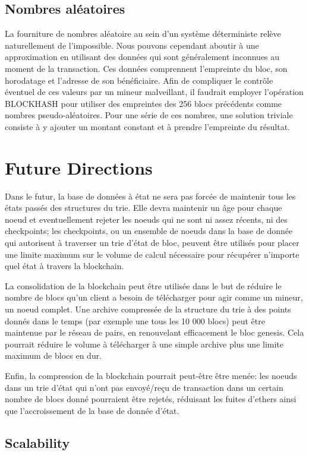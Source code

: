 \documentclass[9pt,oneside]{amsart}
\begin{document}
\begin{multicols}{2}
\subsection{Nombres aléatoires}
La fourniture de nombres aléatoire au sein d'un système déterministe relève naturellement de l'impossible. Nous pouvons cependant aboutir à une approximation en utilisant des données qui sont généralement inconnues au moment de la transaction. Ces données comprennent l'empreinte du bloc, son horodatage et l'adresse de son bénéficiaire. Afin de compliquer le contrôle éventuel de ces valeurs par un mineur malveillant, il faudrait employer l'opération {\small BLOCKHASH} pour utiliser des empreintes des 256 blocs précédents comme nombres pseudo-aléatoires. Pour une série de ces nombres, une solution triviale consiste à y ajouter un montant constant et à prendre l'empreinte du résultat.

\section{Future Directions} \label{ch:future}

Dans le futur, la base de données à état ne sera pas forcée de maintenir tous les états passés des structures du trie. Elle devra maintenir un âge pour chaque noeud et eventuellement rejeter les noeuds qui ne sont ni assez récents, ni des checkpoints; les checkpoints, ou un ensemble de noeuds dans la base de donnée qui autorisent à traverser un trie d'état de bloc, peuvent être utilisés pour placer une limite maximum sur le volume de calcul nécessaire pour récupérer n'importe quel état à travers la blockchain.

La consolidation de la blockchain peut être utilisée dans le but de réduire le nombre de blocs qu'un client a besoin de télécharger pour agir comme un mineur, un noeud complet. Une archive compressée de la structure du trie à des points donnés dans le temps (par exemple une tous les 10 000 blocs) peut être maintenue par le réseau de pairs, en renouvelant efficacement le bloc genesis. Cela pourrait réduire le volume à télécharger à une simple archive plus une limite maximum de blocs en dur.

Enfin, la compression de la blockchain pourrait peut-être être menée: les noeuds dans un trie d'état qui n'ont pas envoyé/reçu de transaction dans un certain nombre de blocs donné pourraient être rejetés, réduisant les fuites d'ethers ainsi que l'accroissement de la base de donnée d'état.

\subsection{Scalability}


\end{multicols}
\end{document}

